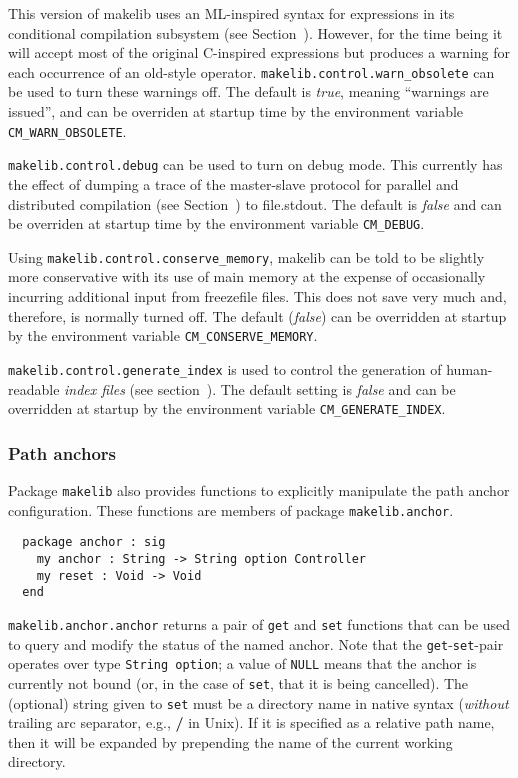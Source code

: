 This version of makelib uses an ML-inspired syntax for expressions in its
conditional compilation subsystem (see Section~).
However, for the time being it will accept most of the original
C-inspired expressions but produces a warning for each occurrence of
an old-style operator. {\tt makelib.control.warn\_obsolete} can be used to
turn these warnings off. The default is {\em true}, meaning ``warnings
are issued'', and can be overriden at startup time by the environment
variable {\tt CM\_WARN\_OBSOLETE}.

{\tt makelib.control.debug} can be used to turn on debug mode.  This
currently has the effect of dumping a trace of the master-slave
protocol for parallel and distributed compilation (see
Section~) to file.stdout. The default is {\em
false} and can be overriden at startup time by the environment
variable {\tt CM\_DEBUG}.

Using {\tt makelib.control.conserve\_memory}, makelib can be told to be slightly
more conservative with its use of main memory at the expense of
occasionally incurring additional input from freezefile files.
This does not save very much and, therefore, is normally turned off.
The default ({\em false}) can be overridden at startup by the
environment variable {\tt CM\_CONSERVE\_MEMORY}.

{\tt makelib.control.generate\_index} is used to control the generation of
human-readable {\em index files} (see section~).
The default setting is {\em false} and can be overridden at startup by
the environment variable {\tt CM\_GENERATE\_INDEX}.

\subsubsection{Path anchors}
\label{sec:api:anchors}

Package {\tt makelib} also provides functions to explicitly manipulate
the path anchor configuration.  These functions are members of
package {\tt makelib.anchor}.

\begin{verbatim}
  package anchor : sig
    my anchor : String -> String option Controller
    my reset : Void -> Void
  end
\end{verbatim}

{\tt makelib.anchor.anchor} returns a pair of {\tt get} and {\tt set}
functions that can be used to query and modify the status of the named
anchor.  Note that the {\tt get}-{\tt set}-pair operates over type
{\tt String option}; a value of {\tt NULL} means that the anchor is
currently not bound (or, in the case of {\tt set}, that it is being
cancelled).  The (optional) string given to {\tt set} must be a
directory name in native syntax ({\em without} trailing arc separator,
e.g., {\bf /} in Unix).  If it is specified as a relative path name,
then it will be expanded by prepending the name of the current working
directory.

